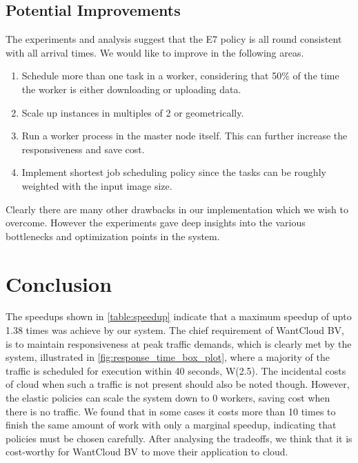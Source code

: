 \documentclass[a4paper]{IEEEtran}
\begin{document}
\subsection{Potential Improvements}

The experiments and analysis suggest that the \textsc{E7} policy is all round consistent with
all arrival times. We would like to improve in the following areas.

\begin{enumerate}
  \item Schedule more than one task in a worker, considering that 50\% of the time the worker is
  either downloading or uploading data.
  \item Scale up instances in multiples of 2 or geometrically.
  \item Run a worker process in the master node itself. This can further increase the responsiveness
  and save cost.
  \item Implement shortest job scheduling policy since the tasks can be roughly weighted with the input image size.
\end{enumerate}

Clearly there are many other drawbacks in our implementation which we wish to overcome. However the experiments gave deep insights into the various bottlenecks and optimization points in the system.

\section{Conclusion} \label{conclusion}

The speedups shown in \autoref{table:speedup} indicate that a maximum speedup of upto 1.38 times was achieve by our system. The chief requirement of WantCloud BV, is to maintain responsiveness at peak traffic demands, which is clearly met by the system, illustrated in \autoref{fig:response_time_box_plot}, where a majority of the traffic is scheduled for execution within 40 seconds, \textsc{W(2.5)}. The incidental costs of cloud when such a traffic is not present should also be noted though. However, the elastic policies can scale the system down to 0 workers, saving cost when there is no traffic. We found that in some cases it costs more than 10 times to finish the same amount of work with only a marginal speedup, indicating that policies must be chosen carefully. After analysing the tradeoffs, we think that it is cost-worthy for WantCloud BV to move their application to cloud.
\end{document}
